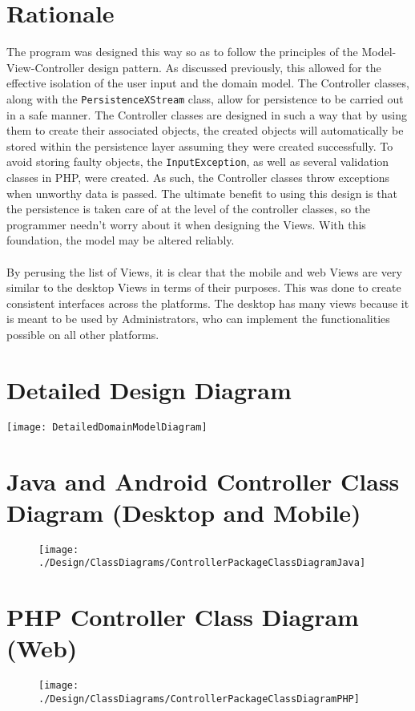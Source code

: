 \documentclass[12pt]{report}
\begin{document}
\section{Rationale}
The program was designed this way so as to follow the principles of the Model-View-Controller design
pattern. As discussed previously, this allowed for the effective isolation of the user input and the
domain model. The Controller classes, along with the \texttt{PersistenceXStream} class, allow for
persistence to be carried out in a safe manner. The Controller classes are designed in such a way
that by using them to create their associated objects, the created objects will automatically be
stored within the persistence layer assuming they were created successfully. To avoid storing faulty
objects, the \texttt{InputException}, as well as several validation classes in PHP, were created. As
such, the Controller classes throw exceptions when unworthy data is passed. The ultimate benefit to
using this design is that the persistence is taken care of at the level of the controller classes,
so the programmer needn't worry about it when designing the Views. With this foundation, the model
may be altered reliably.\\\\
By perusing the list of Views, it is clear that the mobile and web Views are very similar to the
desktop Views in terms of their purposes. This was done to create consistent interfaces across the
platforms. The desktop has many views because it is meant to be used by Administrators, who can
implement the functionalities possible on all other platforms.
\section{Detailed Design Diagram}
\texttt{[image: DetailedDomainModelDiagram]}
\section{Java and Android Controller Class Diagram (Desktop and Mobile)}
\begin{figure}[H]
	\centering
	\texttt{[image: ./Design/ClassDiagrams/ControllerPackageClassDiagramJava]}
\end{figure}
\section{PHP Controller Class Diagram (Web)}
\begin{figure}[H]
	\centering
	\texttt{[image: ./Design/ClassDiagrams/ControllerPackageClassDiagramPHP]}
\end{figure}
\end{document}

